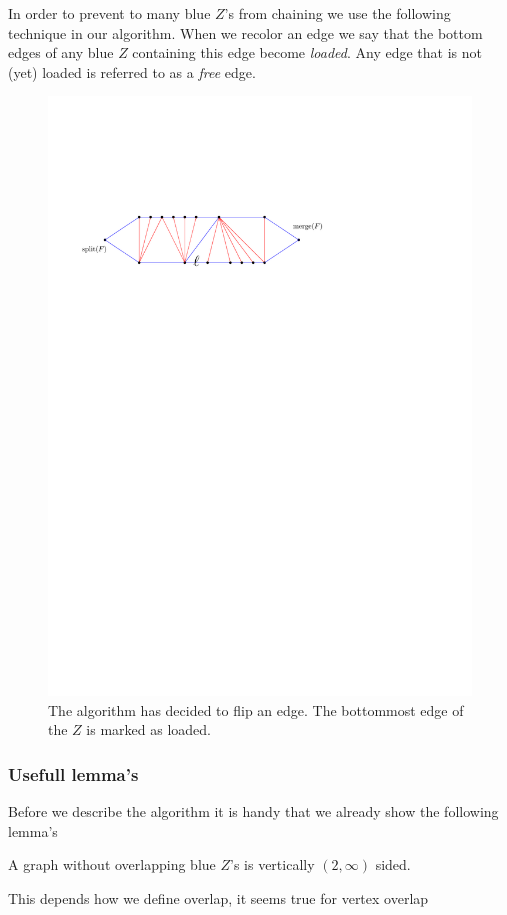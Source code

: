   In order to prevent to many blue $Z$'s from chaining we use the following technique in our algorithm. When we recolor an edge we say that the bottom edges of any blue $Z$ containing        this edge become \emph{loaded}. Any edge that is not (yet) loaded is referred to as a \emph{free} edge.
  \begin{figure}[h]
    \centering
    \includegraphics[scale=1]{unifiedAlgo/img/load}
    \caption{The algorithm has decided to flip an edge. The bottommost edge of the $Z$ is marked as loaded. }
    \label{fig:uni:load}
  \end{figure}


\subsubsection{Usefull lemma's}
  Before we describe the algorithm it is handy that we already show the following lemma's
  \begin{lemma}
    \label{lm:}
    A graph without overlapping blue $Z$'s is vertically $(2, \infty)$ sided.
  \end{lemma}
  This depends how we define overlap, it seems true for vertex overlap

